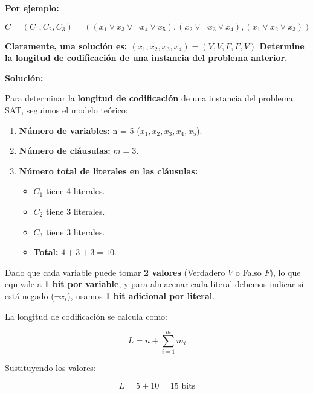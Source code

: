 \documentclass[12pt]{article}
\begin{document}
{{\begin{enumerate}
            \textbf{Por ejemplo: }

                \[
                    C = (C_1, C_2, C_3) = ((x_1 \lor x_3 \lor \neg x_4 \lor x_5), (x_2 \lor \neg x_3 \lor x_4), (x_1 \lor x_2 \lor x_3))
                \]

            \textbf{Claramente, una solución es: $(x_1, x_2, x_3, x_4) = (V, V, F, F, V)$ Determine la longitud de codificación de una instancia del problema anterior.}

            \textbf{Solución: }
            {

                Para determinar la \textbf{longitud de codificación} de una instancia del problema SAT, seguimos el modelo teórico:

                \begin{enumerate}
                    \item \textbf{Número de variables:} n = 5 ($x_1, x_2, x_3, x_4, x_5$).
                    \item \textbf{Número de cláusulas:} $m = 3$.
                    \item \textbf{Número total de literales en las cláusulas:}
                    \begin{itemize}
                        \item $C_1$ tiene 4 literales.
                        \item $C_2$ tiene 3 literales.
                        \item $C_3$ tiene 3 literales.
                        \item \textbf{Total:} $4 + 3 + 3 = 10$.
                    \end{itemize}
                \end{enumerate}
                
                Dado que cada variable puede tomar \textbf{2 valores} (Verdadero $V$ o Falso $F$), lo que equivale a \textbf{1 bit por variable}, y para almacenar cada literal debemos indicar si está negado ($\neg x_i$), usamos \textbf{1 bit adicional por literal}.
                
                La longitud de codificación se calcula como:
                
                    \[
                        L = n + \sum_{i=1}^{m} m_i
                    \]
                
                Sustituyendo los valores:
                
                    \[
                        L = 5 + 10 = 15 \text{ bits}
                    \]
                
}
\end{enumerate}}}
\end{document}
